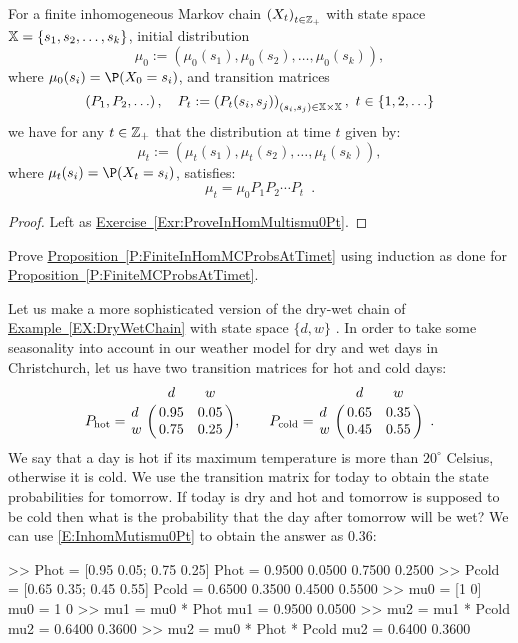 \begin{prop}\label{P:FiniteInHomMCProbsAtTimet}
For a finite inhomogeneous Markov chain $\left(X_t\right)_{t \in \mathbb{Z}_+}$ with state space $\mathbb{X}=\{s_1,s_2,\ldots,s_k\}$, initial distribution $$\mu_0 := \left( \mu_0(s_1), \mu_0(s_2), \ldots, \mu_0(s_k) \right),$$ where $\mu_0(s_i) = \P(X_0=s_i)$, and transition matrices 
$$\left(P_1,P_2,\ldots\right), \quad P_t := \left(P_t(s_i,s_j)\right)_{(s_i,s_j)\in \mathbb{X}\times \mathbb{X}}, \ t \in \{1,2,\ldots\}$$ we have for any $t \in \mathbb{Z}_+$ that the distribution at time $t$ given by:
$$\mu_t := \left( \mu_t(s_1), \mu_t(s_2), \ldots, \mu_t(s_k) \right),$$
where $\mu_t(s_i) = \P(X_t=s_i)$, satisfies:
\begin{equation}\label{E:InhomMutismu0Pt}
\mu_t = \mu_0 P_1 P_2 \cdots P_t \enspace .
\end{equation}
\begin{proof}
Left as \hyperref[Exr:ProveInHomMultismu0Pt]{Exercise~\ref*{Exr:ProveInHomMultismu0Pt}}.
\end{proof}
\end{prop}

\begin{exercise}\label{Exr:ProveInHomMultismu0Pt}
Prove \hyperref[P:FiniteInHomMCProbsAtTimet]{Proposition~\ref*{P:FiniteInHomMCProbsAtTimet}} using induction as done for \hyperref[P:FiniteMCProbsAtTimet]{Proposition~\ref*{P:FiniteMCProbsAtTimet}}.
\end{exercise}


\begin{example}\label{EX:DryWetChainHotCold}
Let us make a more sophisticated version of the dry-wet chain of \hyperref[EX:DryWetChain]{Example~\ref*{EX:DryWetChain}} with state space $\{d,w\}$ .  In order to take some seasonality into account in our weather model for dry and wet days in Christchurch, let us have two transition matrices for hot and cold days:
\[
P_{\text{hot}} = 
\bordermatrix{~ & d & w \cr
d & 0.95 & 0.05 \cr
w & 0.75 & 0.25},
\qquad
P_{\text{cold}} = 
\bordermatrix{~ & d & w \cr
d & 0.65 & 0.35 \cr
w & 0.45 & 0.55} \enspace .
\]
We say that a day is hot if its  maximum temperature is more than $20^{\circ}$ Celsius, otherwise it is cold.  We use the transition matrix for today to obtain the state probabilities for tomorrow.  If today is dry and hot and tomorrow is supposed to be cold then what is the probability that the day after tomorrow will be wet?  We can use \eqref{E:InhomMutismu0Pt} to obtain the answer as $0.36$: 
\begin{VrbM}
>> Phot = [0.95 0.05; 0.75 0.25] %
Phot =
    0.9500    0.0500
    0.7500    0.2500
>> Pcold = [0.65 0.35; 0.45 0.55] %
Pcold =
    0.6500    0.3500
    0.4500    0.5500
>> mu0 = [1 0] %
mu0 =     1     0
>> mu1 = mu0 * Phot %
mu1 =    0.9500    0.0500
>> mu2 = mu1 * Pcold %
mu2 =    0.6400    0.3600
>> mu2 = mu0 * Phot * Pcold %
mu2 =    0.6400    0.3600
\end{VrbM}
\end{example}

